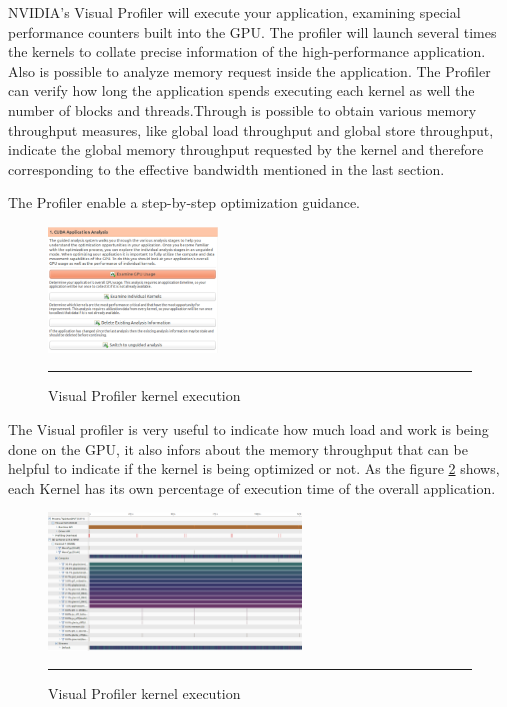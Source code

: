 NVIDIA's Visual Profiler will execute your application, examining special performance counters built into the GPU. The profiler will launch several times the kernels to collate precise information of the high-performance application. Also is possible to analyze memory request inside the application\cite{example}. The Profiler can verify how long the application spends executing each kernel as well the number of blocks and threads.Through is possible to obtain various memory throughput measures, like global load throughput and global store throughput, indicate the global memory throughput requested by the kernel and therefore corresponding to the effective bandwidth mentioned in the last section.

The Profiler enable a step-by-step optimization guidance.

\begin{figure}[htbp]
	\centering
		\includegraphics[width=0.4\textwidth]{Figures/kernel.png}
		\rule{35em}{0.5pt}
	\caption[Visual Profiler example]{Visual Profiler kernel execution}
	\label{fig:visual01}
\end{figure}


The Visual profiler is very useful to indicate how much load and work is being done on the GPU, it also infors about the memory throughput that can be helpful to indicate if the kernel is being optimized or not. As the figure \ref{fig:visual01} shows, each Kernel has its own percentage of execution time of the overall application.\cite{practices}

\begin{figure}[htbp]
	\centering
		\includegraphics[width=0.6\textwidth]{Figures/visual01.png}
		\rule{35em}{0.5pt}
	\caption[Visual Profiler example]{Visual Profiler kernel execution}
	\label{fig:visual01}
\end{figure}

